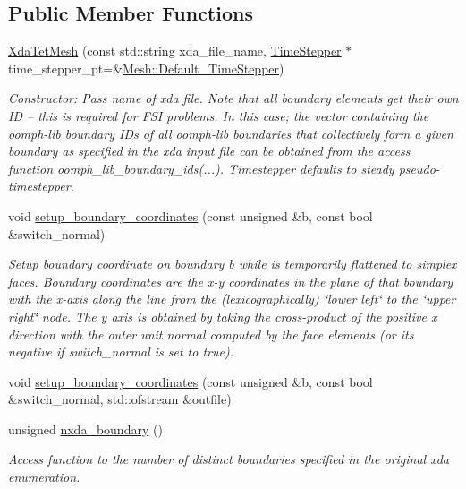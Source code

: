 \subsection*{Public Member Functions}
\begin{DoxyCompactItemize}
\item 
\hyperlink{classoomph_1_1XdaTetMesh_a4cea32a11d0899ac230de66899e503d1}{Xda\+Tet\+Mesh} (const std\+::string xda\+\_\+file\+\_\+name, \hyperlink{classoomph_1_1TimeStepper}{Time\+Stepper} $\ast$time\+\_\+stepper\+\_\+pt=\&\hyperlink{classoomph_1_1Mesh_a12243d0fee2b1fcee729ee5a4777ea10}{Mesh\+::\+Default\+\_\+\+Time\+Stepper})
\begin{DoxyCompactList}\small\item\em Constructor\+: Pass name of xda file. Note that all boundary elements get their own ID -- this is required for F\+SI problems. In this case; the vector containing the oomph-\/lib boundary I\+Ds of all oomph-\/lib boundaries that collectively form a given boundary as specified in the xda input file can be obtained from the access function oomph\+\_\+lib\+\_\+boundary\+\_\+ids(...). Timestepper defaults to steady pseudo-\/timestepper. \end{DoxyCompactList}\item 
void \hyperlink{classoomph_1_1XdaTetMesh_a3a09ba1d3e29133dd032519ced703815}{setup\+\_\+boundary\+\_\+coordinates} (const unsigned \&b, const bool \&switch\+\_\+normal)
\begin{DoxyCompactList}\small\item\em Setup boundary coordinate on boundary b while is temporarily flattened to simplex faces. Boundary coordinates are the x-\/y coordinates in the plane of that boundary with the x-\/axis along the line from the (lexicographically) \char`\"{}lower left\char`\"{} to the \char`\"{}upper right\char`\"{} node. The y axis is obtained by taking the cross-\/product of the positive x direction with the outer unit normal computed by the face elements (or its negative if switch\+\_\+normal is set to true). \end{DoxyCompactList}\item 
void \hyperlink{classoomph_1_1XdaTetMesh_a415f0211f064766f8c38bca6f877c192}{setup\+\_\+boundary\+\_\+coordinates} (const unsigned \&b, const bool \&switch\+\_\+normal, std\+::ofstream \&outfile)
\item 
unsigned \hyperlink{classoomph_1_1XdaTetMesh_ad81712bc6c7215d64494ccafc8c99dd5}{nxda\+\_\+boundary} ()
\begin{DoxyCompactList}\small\item\em Access function to the number of distinct boundaries specified in the original xda enumeration. \end{DoxyCompactList}\item 

\end{DoxyCompactItemize}
